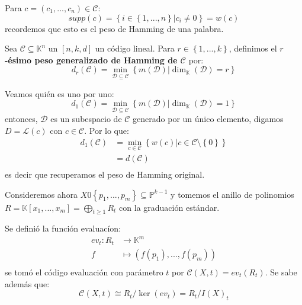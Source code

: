 \documentclass[12pt]{report}
\newcounter{it}
\theoremstyle{largebreak}
\newcommand{\gen}[1]{\ensuremath{\mathcal{L}\left(#1 \right)}}
\begin{document}
    \begin{obs}
        Para $c=(c_1,...,c_n)\in\mathcal{C}$:
        \begin{equation*}
            supp(c)=\left\{i\in\left\{1,...,n \right\}\Big|c_i\neq0 \right\}=w(c)
        \end{equation*}
        recordemos que esto es el peso de Hamming de una palabra.
    \end{obs}

    \begin{mydef}
        Sea $\mathcal{C}\subseteq\mathbb{K}^n$ un $[n,k,d]$ un código lineal. Para $r\in\left\{1,...,k \right\}$, definimos el \textbf{$r$-ésimo peso generalizado de Hamming de $\mathcal{C}$} por:
        \begin{equation*}
            d_r(\mathcal{C})=\min_{\mathcal{D}\subseteq\mathcal{C}}\left\{m(\mathcal{D})\Big|\dim_{\mathbb{K}}(\mathcal{D})=r \right\}
        \end{equation*}
    \end{mydef}

    \begin{obs}
        Veamos quién es uno por uno:
        \begin{equation*}
            d_1(\mathcal{C})=\min_{ \mathcal{D}\subseteq\mathcal{C}}\left\{m(\mathcal{D})\Big|\dim_{\mathbb{K}}(\mathcal{D})=1 \right\}
        \end{equation*}
        entonces, $\mathcal{D}$ es un subespacio de $\mathcal{C}$ generado por un único elemento, digamos $D=\gen{c}$ con $c\in\mathcal{C}$. Por lo que:
        \begin{equation*}
            \begin{split}
                d_1(\mathcal{C})&=\min_{ c\in\mathcal{C}}\left\{w(c)\Big|c\in\mathcal{C}\setminus\left\{0\right\} \right\}\\
                &=d(\mathcal{C})\\
            \end{split}
        \end{equation*}
        es decir que recuperamos el peso de Hamming original.
    \end{obs}

    Consideremos ahora $X0\left\{p_1,...,p_m \right\}\subseteq\mathbb{P}^{ k-1}$ y tomemos el anillo de polinomios $R=\mathbb{K}[x_1,...,x_m]=\bigoplus_{ t\geq1}R_t$ con la graduación estándar.

    Se definió la función evaluacíon:
    \begin{equation*}
        \begin{split}
            ev_t:R_t&\rightarrow\mathbb{K}^{m}\\
            f&\mapsto(f(p_1),...,f(p_m))\\ 
        \end{split}
    \end{equation*}
    se tomó el código evaluación con parámetro $t$ por $\mathcal{C}(X,t)=ev_t(R_t)$. Se sabe además que:
    \begin{equation*}
        \mathcal{C}(X,t)\cong R_t/\ker(ev_t)=R_t/I(X)_t
    \end{equation*}
\end{document}
